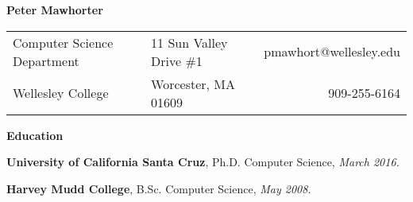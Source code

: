 \documentclass[11pt]{article}
\newenvironment{sct}[1]{%
  \vspace{8pt plus 2pt minus 4pt}\textbf{\Large #1} \hrulefill\vspace{6pt}
  \begin{adjustwidth}{6pt}{0pt}
}{%
  \end{adjustwidth}
}
\newcommand{\edu}[3]{\textbf{#1}, #2, \textit{#3.}}
\begin{document}
\textbf{\huge Peter Mawhorter }\hrulefill\vspace{6pt}

\begin{tabularx}{\textwidth}{p{17.0em} p{13.6em} r}
Computer Science Department & 11 Sun Valley Drive \#1 & pmawhort@wellesley.edu \\
Wellesley College & Worcester, MA 01609 & 909-255-6164 \\
\end{tabularx}

\begin{sct}{Education}

\edu{University of California Santa Cruz}{Ph.D. Computer Science}{March 2016}

\edu{Harvey Mudd College}{B.Sc. Computer Science}{May 2008}

\end{sct}
\end{document}
